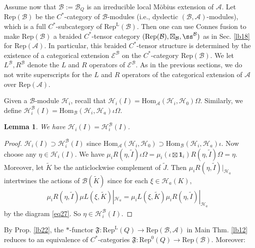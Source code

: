 \documentclass[12pt,a4paper,notitlepage]{article}
\theoremstyle{definition}
\theoremstyle{plain}
\newtheorem{lm}[df]{Lemma}
\newcommand{\fk}{\mathfrak}
\newcommand{\mc}{\mathcal}
\newcommand{\wtd}{\widetilde}
\newcommand{\id}{\mathbf{1}}
\newcommand{\Hom}{\mathrm{Hom}}
\newcommand{\Rep}{\mathrm{Rep}}
\newcommand{\scr}{\mathscr}
\newcommand{\RepA}{\mathrm{Rep}(\mathcal A)}
\newcommand{\RepL}{\mathrm{Rep}^{\mathrm{L}}}
\numberwithin{equation}{section}
\begin{document}
Assume now that $\mc B:=\mc B_Q$ is an irreducible local M\"obius extension of $\mc A$. Let $\Rep(\mc B)$ be the $C^*$-category of $\mc B$-modules (i.e., dyslectic $(\mc B,\mc A)$-modules), which is a full $C^*$-subcategory of $\RepL(\mc B)$. Then one can use Connes fusion to make $\Rep(\mc B)$ a braided $C^*$-tensor category $(\Rep(\mc B),\boxtimes_{\mc B},\ss^{\mc B})$  as in Sec. \ref{lb18} for $\RepA$. In particular, this braided $C^*$-tensor structure is determined by the existence of a categorical extension $\scr E^{\mc B}$ on the $C^*$-category $\Rep(\mc B)$. We let $L^{\mc B},R^{\mc B}$ denote the $L$ and $R$ operators of $\scr E^{\mc B}$. As in the previous sections, we do not write superscripts for the $L$ and $R$ operators of the categorical extension of $\mc A$ over $\RepA$.

Given a $\mc B$-module $\mc H_i$, recall that $\mc H_i(I)=\Hom_{\mc A}(\mc H_i,\mc H_0)\Omega$. Similarly, we define $\mc H_i^{\mc B}(I)=\Hom_{\mc B}(\mc H_i,\mc H_a)\iota\Omega$.
\begin{lm}
We have $\mc H_i(I)=\mc H_i^{\mc B}(I)$.
\end{lm}
\begin{proof}
$\mc H_i(I)\supset\mc H_i^{\mc B}(I)$ since $\Hom_{\mc A}(\mc H_i,\mc H_0)\supset\Hom_{\mc B}(\mc H_i,\mc H_a)\iota$. Now choose any $\eta\in\mc H_i(I)$. We have $\mu_i R(\eta,\wtd I)\iota\Omega=\mu_i(\iota\boxtimes\id_i)R(\eta,\wtd I)\Omega=\eta$. Moreover, let $\wtd K$ be the anticlockwise complement of $\wtd J$. Then $\mu_i R(\eta,\wtd I)|_{\mc H_a}$ intertwines the actions of $\mc B(\wtd K)$ since for each $\xi\in\mc H_a(K)$, 
\begin{align*}
	\mu_i R(\eta,\wtd I)\mu L(\xi,\wtd K)|_{\mc H_a}=\mu_i L(\xi,\wtd K)\mu_i R(\eta,\wtd I)|_{\mc H_a}	
\end{align*}
by the diagram \eqref{eq27}. So $\eta\in \mc H_i^{\mc B}(I)$.
\end{proof}






By Prop. \ref{lb22}, the $*$-functor $\fk F:\RepL(Q)\rightarrow\Rep(\mc B,\mc A)$ in Main Thm. \ref{lb12} reduces to an equivalence of $C^*$-categories $\fk F:\Rep^0(Q)\rightarrow\Rep(\mc B)$. Moreover:
\end{document}
